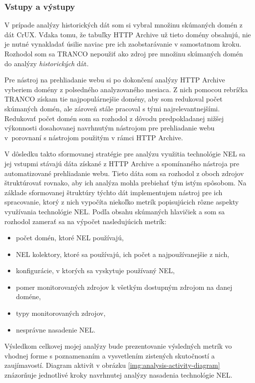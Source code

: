 \subsubsection{Vstupy a výstupy}

V prípade analýzy historických dát som si vybral množinu skúmaných domén z dát CrUX. 
Vďaka tomu, že tabuľky HTTP Archive už tieto domény obsahujú, nie je nutné vynakladať úsilie naviac pre ich zaobstarávanie v samostatnom kroku. 
Rozhodol som sa TRANCO nepoužiť ako zdroj pre množinu skúmaných domén do analýzy \textit{historických} dát.

Pre nástroj na prehliadanie webu si po dokončení analýzy HTTP Archive vyberiem domény z polsedného analyzovaného mesiaca. 
Z nich pomocou rebríčka TRANCO získam tie najpopulárnejšie domény, aby som redukoval počet skúmaných domén, ale zároveň stále pracoval s tými najrelevantnejšími.
Redukovať počet domén som sa rozhodol z dôvodu predpokladanej nižšej výkonnosti dosahovanej navrhnutým nástrojom pre prehliadanie webu \mbox{v porovnaní} s nástrojom použitým v rámci HTTP Archive. 

V dôsledku takto sformovanej stratégie pre analýzu využitia technológie NEL sa jej vstupmi stávajú dáta získané z HTTP Archive a spomínaného nástroja pre automatizované prehliadanie webu.
Tieto dáta som sa rozhodol z oboch zdrojov štruktúrovať rovnako, aby ich analýza mohla prebiehať tým istým spôsobom.
Na základe sformovanej štruktúry týchto dát implementujem nástroj pre ich spracovanie, ktorý z nich vypočíta niekoľko metrík popisujúcich rôzne aspekty využívania technológie NEL.
Podľa obsahu skúmaných hlavičiek  a  som sa rozhodol zamerať sa na výpočet nasledujúcich metrík:
\begin{itemize}
    \item počet domén, ktoré NEL používajú,
    \item NEL kolektory, ktoré sa používajú, ich počet a najpoužívanejšie z nich,
    \item konfigurácie, v ktorých sa vyskytuje používaný NEL,
    \item pomer monitorovaných zdrojov k všetkým dostupným zdrojom na danej doméne,
    \item typy monitorovaných zdrojov,
    \item nesprávne nasadenie NEL.
\end{itemize}

Výsledkom celkovej mojej analýzy bude prezentovanie výsledných metrík vo vhodnej forme s poznamenaním a vysvetlením zistených skutočností a zaujímavostí. 
Diagram aktivít v obrázku \ref{img:analysis-activity-diagram} znázorňuje jednotlivé kroky navrhnutej analýzy nasadenia technológie NEL. 

